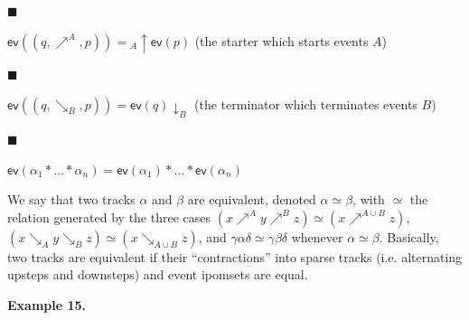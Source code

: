  
 
\par\noindent  $\blacksquare$ 
 
$\mathsf{ev}((q,\mathrel{\nearrow^{A}},p))={}_{A\!}{\uparrow}{\mathsf{ev}(p)}$ (the starter which starts events $A$)\par
 
 
 
\par\noindent  $\blacksquare$ 
 
$\mathsf{ev}((q,\mathrel{\searrow_{B}},p))={\mathsf{ev}(q)}{\downarrow}_{B}$ (the terminator which terminates events $B$)\par
 
 
 
\par\noindent  $\blacksquare$ 
 
$\mathsf{ev}(\alpha_{1}*\dots*\alpha_{n})=\mathsf{ev}(\alpha_{1})*\dots*\mathsf{ev}(\alpha_{n})$\par
 
 
  
We say that two tracks $\alpha$ and $\beta$ are equivalent, denoted $\alpha\simeq\beta$, with $\simeq$ the relation generated by the three cases $(x\mathrel{\nearrow^{A}}y\mathrel{\nearrow^{B}}z)\simeq(x\mathrel{\nearrow^{A\cup B}}z)$, $(x\mathrel{\searrow_{A}}y\mathrel{\searrow_{B}}z)\simeq(x\mathrel{\searrow_{A\cup B}}z)$, and $\gamma\alpha\delta\simeq\gamma\beta\delta$ whenever $\alpha\simeq\beta$. Basically, two tracks are equivalent if their “contractions” into sparse tracks (i.e. alternating upsteps and downsteps) and event ipomsets are equal.\par
 
 
 
\par\medskip\noindent\textbf{Example 15.}\par
 
 
